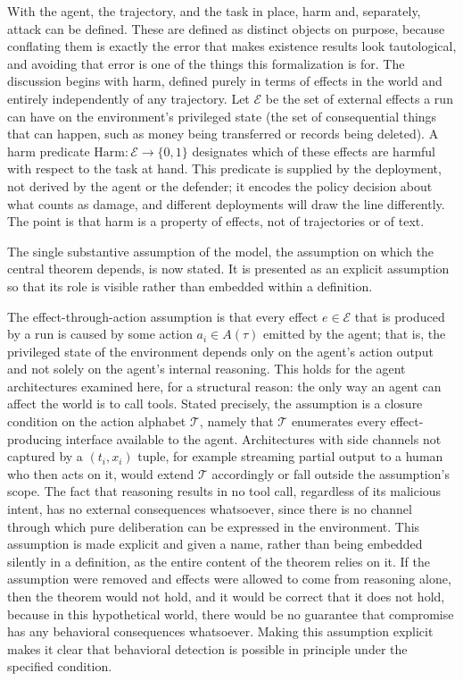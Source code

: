 \documentclass[journal]{IEEEtran}
\theoremstyle{remark}
\begin{document}
With the agent, the trajectory, and the task in place, harm and, separately, attack can be defined. These are defined as distinct objects on purpose, because conflating them is exactly the error that makes existence results look tautological, and avoiding that error is one of the things this formalization is for. The discussion begins with harm, defined purely in terms of effects in the world and entirely independently of any trajectory. Let $\mathcal{E}$ be the set of external effects a run can have on the environment's privileged state (the set of consequential things that can happen, such as money being transferred or records being deleted). A harm predicate $\mathrm{Harm}:\mathcal{E}\to\{0,1\}$ designates which of these effects are harmful with respect to the task at hand. This predicate is supplied by the deployment, not derived by the agent or the defender; it encodes the policy decision about what counts as damage, and different deployments will draw the line differently. The point is that harm is a property of effects, not of trajectories or of text.

The single substantive assumption of the model, the assumption on which the central theorem depends, is now stated. It is presented as an explicit assumption so that its role is visible rather than embedded within a definition.

The effect-through-action assumption is that every effect $e\in\mathcal{E}$ that is produced by a run is caused by some action $a_i\in A(\tau)$ emitted by the agent; that is, the privileged state of the environment depends only on the agent's action output and not solely on the agent's internal reasoning. This holds for the agent architectures examined here, for a structural reason: the only way an agent can affect the world is to call tools. Stated precisely, the assumption is a closure condition on the action alphabet $\mathcal{T}$, namely that $\mathcal{T}$ enumerates every effect-producing interface available to the agent. Architectures with side channels not captured by a $(t_i, x_i)$ tuple, for example streaming partial output to a human who then acts on it, would extend $\mathcal{T}$ accordingly or fall outside the assumption's scope. The fact that reasoning results in no tool call, regardless of its malicious intent, has no external consequences whatsoever, since there is no channel through which pure deliberation can be expressed in the environment. This assumption is made explicit and given a name, rather than being embedded silently in a definition, as the entire content of the theorem relies on it. If the assumption were removed and effects were allowed to come from reasoning alone, then the theorem would not hold, and it would be correct that it does not hold, because in this hypothetical world, there would be no guarantee that compromise has any behavioral consequences whatsoever. Making this assumption explicit makes it clear that behavioral detection is possible in principle under the specified condition.
\end{document}
